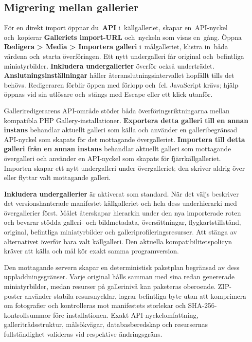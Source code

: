 \documentclass[11pt,a4paper]{article}
\newcommand{\ui}[1]{\textbf{#1}}
\begin{document}
\subsection{Migrering mellan gallerier}

För en direkt import öppnar du~\ui{API} i~källgalleriet, skapar
en~API-nyckel och~kopierar \ui{Galleriets import-URL} och~nyckeln
som visas en~gång. Öppna \ui{Redigera > Media > Importera galleri}
i~målgalleriet, klistra in~båda värdena och~starta överföringen.
Ett nytt undergalleri får original och~befintliga miniatyrbilder.
\ui{Inkludera undergallerier} överför också underträdet.
\ui{Anslutningsinställningar} håller återanslutningsintervallet
hopfällt tills det behövs. Redigeraren förblir öppen med förlopp
och~fel. JavaScript krävs; hjälp öppnas vid sin utlösare och~stängs
med Escape eller ett klick utanför.

Galleriredigerarens API-område stöder båda överföringsriktningarna mellan
kompatibla PHP Gallery-installationer. \ui{Exportera detta galleri till en annan
instans} behandlar aktuellt galleri som källa och använder en galleribegränsad
API-nyckel som skapats för det mottagande övergalleriet. \ui{Importera till
detta galleri från en annan instans} behandlar aktuellt galleri som mottagande
övergalleri och använder en API-nyckel som skapats för fjärrkällgalleriet.
Importen skapar ett nytt undergalleri under övergalleriet; den skriver aldrig
över eller flyttar valt mottagande galleri.

\ui{Inkludera undergallerier} är aktiverat som standard. När det väljs beskriver
det versionshanterade manifestet källgalleriet och hela dess underhierarki med
övergallerier först. Målet återskapar hierarkin under den nya importerade roten
och bevarar stödda galleri- och bildmetadata, översättningar,
flygkartstillstånd, original, befintliga miniatyrbilder och
galleriprofileringsresurser. Att stänga av alternativet överför bara valt
källgalleri. Den aktuella kompatibilitetspolicyn kräver att källa och mål kör
exakt samma programversion.

Den mottagande servern skapar en deterministisk paketplan begränsad av dess
uppladdningsgränser. Varje original hålls samman med sina redan genererade
miniatyrbilder, medan resurser på gallerinivå kan paketeras oberoende.
ZIP-poster använder stabila resursnycklar, lagrar befintliga byte utan att
komprimera om fotografier och kontrolleras mot manifestets storlekar och
SHA-256-kontrollsummor före installationen. Exakt API-nyckelomfattning,
galleriträdsstruktur, målsökvägar, databasberedskap och resursernas
fullständighet valideras vid respektive ändringsgräns.
\end{document}
